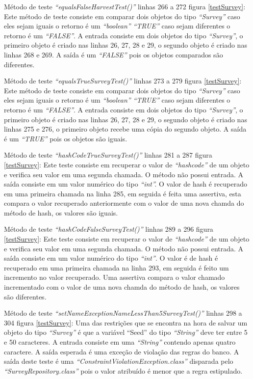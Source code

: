 Método de teste \textit{“equalsFalseHarvestTest()”} linhas 266 a 272 figura \ref{testSurvey}: Este método de teste consiste em comparar dois objetos do tipo \textit{“Survey”} caso eles sejam iguais o retorno é um \textit{“boolean”} \textit{“TRUE”} caso sejam diferentes o retorno é um \textit{“FALSE”}. A entrada consiste em dois objetos do tipo \textit{“Survey”}, o primeiro objeto é criado nas linhas 26, 27, 28 e 29, o segundo objeto é criado nas linhas 268 e 269. A saída é um \textit{“FALSE”} pois os objetos comparados são diferentes.

Método de teste \textit{“equalsTrueSurveyTest()”} linhas 273 a 279 figura \ref{testSurvey}: Este método de teste consiste em comparar dois objetos do tipo \textit{“Survey”} caso eles sejam iguais o retorno é um \textit{“boolean”} \textit{“TRUE”} caso sejam diferentes o retorno é um \textit{“FALSE”}. A entrada consiste em dois objetos do tipo \textit{“Survey”}, o primeiro objeto é criado nas linhas 26, 27, 28 e 29, o segundo objeto é criado nas linhas 275 e 276, o primeiro objeto recebe uma cópia do segundo objeto. A saída é um \textit{“TRUE”} pois os objetos são iguais.

Método de teste \textit{“hashCodeTrueSurveyTest()”} linhas 281 a 287 figura \ref{testSurvey}: Este teste consiste em recuperar o valor de \textit{“hashcode”} de um objeto e verifica seu valor em uma segunda chamada. O método não possui entrada. A saída consiste em um valor numérico do tipo \textit{“int”.} O valor de hash é recuperado em uma primeira chamada na linha 285, em seguida é feita uma assertiva, esta compara o valor recuperado anteriormente com o valor de uma nova chamda do método de hash, os valores são iguais.

Método de teste\textit{ “hashCodeFalseSurveyTest()”} linhas 289 a 296 figura \ref{testSurvey}: Este teste consiste em recuperar o valor de \textit{“hashcode”} de um objeto e verifica seu valor em uma segunda chamada. O método não possui entrada. A saída consiste em um valor numérico do tipo\textit{ “int”}. O valor é de hash é recuperado em uma primeira chamada na linha 293, em seguida é feito um incremento no valor recuperado. Uma assertiva compara o valor chamado incrementado com o valor de uma nova chamda do método de hash, os valores são diferentes.


Método de teste \textit{“setNameExceptionNameLessThan5SurveyTest()”} linhas 298 a 304 figura \ref{testSurvey}: Uma das restrições que se encontra na hora de salvar um objeto do tipo \textit{“Survey”} é que a variável “Seed” do tipo \textit{“String”} deve ter entre 5 e 50 caracteres. A entrada consiste em uma \textit{“String”} contendo apenas quatro caractere. A saída esperada é uma exceção de violação das regras do banco. A saída deste teste é uma \textit{“ConstraintViolationException.class”} disparada pelo \textit{“SurveyRepository.class”} pois o valor atribuído é menor que a regra estipulado.

